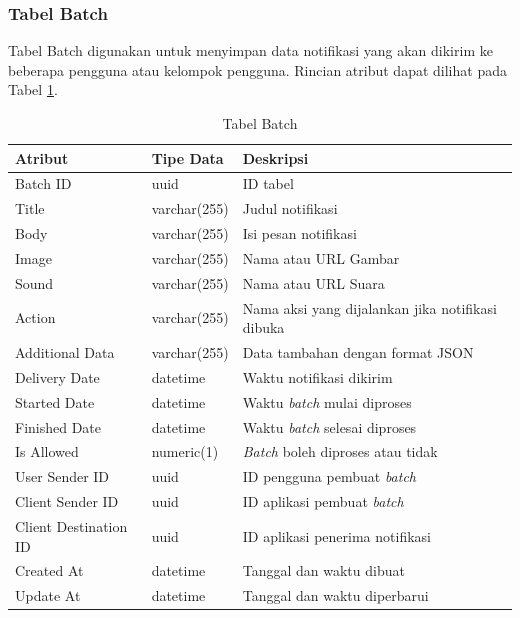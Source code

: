 \subsubsection{Tabel Batch}
\par Tabel Batch digunakan untuk menyimpan data notifikasi yang akan dikirim ke beberapa pengguna atau kelompok pengguna. Rincian atribut dapat dilihat pada Tabel \ref{tabel_batch}.
\begin{longtable}{|p{2cm}|p{2.5cm}|p{4.5cm}|}
	\caption{Tabel Batch} \label{tabel_batch} \\ \hline
    {Atribut} & {Tipe Data} & {Deskripsi} \\ \hline
    Batch ID & uuid & ID tabel \\ \hline
    Title & varchar(255) & Judul notifikasi \\ \hline
    Body & varchar(255) & Isi pesan notifikasi \\ \hline
    Image & varchar(255) & Nama atau URL Gambar \\ \hline
    Sound & varchar(255) & Nama atau URL Suara \\ \hline
    Action & varchar(255) & Nama aksi yang dijalankan jika notifikasi dibuka \\ \hline
    Additional Data & varchar(255) & Data tambahan dengan format JSON \\ \hline
    Delivery Date & datetime & Waktu notifikasi dikirim \\ \hline
    Started Date & datetime & Waktu \textit{batch} mulai diproses \\ \hline
    Finished Date & datetime & Waktu \textit{batch} selesai diproses \\ \hline
    Is Allowed & numeric(1) & \textit{Batch} boleh diproses atau tidak \\ \hline
    User Sender ID & uuid & ID pengguna pembuat \textit{batch} \\ \hline
    Client Sender ID & uuid & ID aplikasi pembuat \textit{batch} \\ \hline
    Client Destination ID & uuid & ID aplikasi penerima notifikasi \\ \hline
    Created At & datetime & Tanggal dan waktu dibuat \\ \hline
    Update At & datetime & Tanggal dan waktu diperbarui \\ \hline
\end{longtable}

